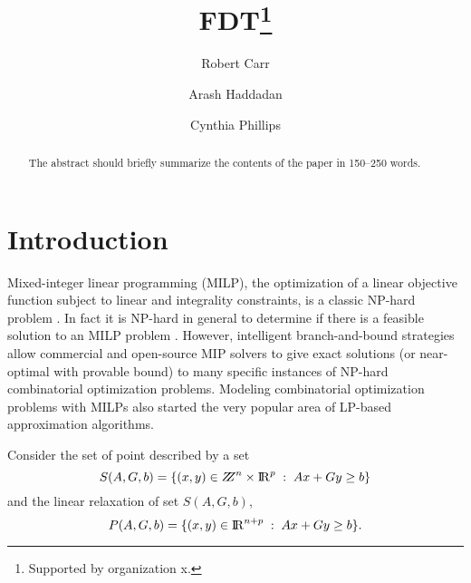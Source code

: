 \documentclass[runningheads]{llncs}
\begin{document}
%
\title{FDT\thanks{Supported by organization x.}}
%
%
\author{Robert Carr\orcidID{} \and
Arash Haddadan\orcidID{} \and
Cynthia Phillips\orcidID{}}
%
%
%
\maketitle              %
%
\begin{abstract}
The abstract should briefly summarize the contents of the paper in
150--250 words.

\end{abstract}
%
%
%

\section{Introduction}
Mixed-integer linear programming (MILP), the optimization of a linear objective function subject to linear and integrality constraints, is a classic NP-hard problem \cite{GJ79}. In fact it is NP-hard in general to determine if there is a feasible solution to an MILP problem \cite{GJ79}. However, intelligent branch-and-bound strategies allow commercial and open-source MIP solvers to give exact solutions (or near-optimal with provable bound) to many specific instances of NP-hard combinatorial optimization problems. Modeling combinatorial optimization problems with MILPs also started the very popular area of LP-based approximation algorithms. 

Consider the set of point described by a set 
\begin{equation}
S(A,G,b)= \{(x,y)\in \bbbz^{n}\times \bbbr^p\;:\; Ax+Gy\geq b\}  \label{S}
\end{equation}
and the  linear relaxation of set $S(A,G,b)$,
\begin{equation}
P(A,G,b) = \{(x,y)\in {\rm I\!R}^{n+ p}\;:\; Ax+Gy\geq b\}. \label{P}
\end{equation}
\end{document}
